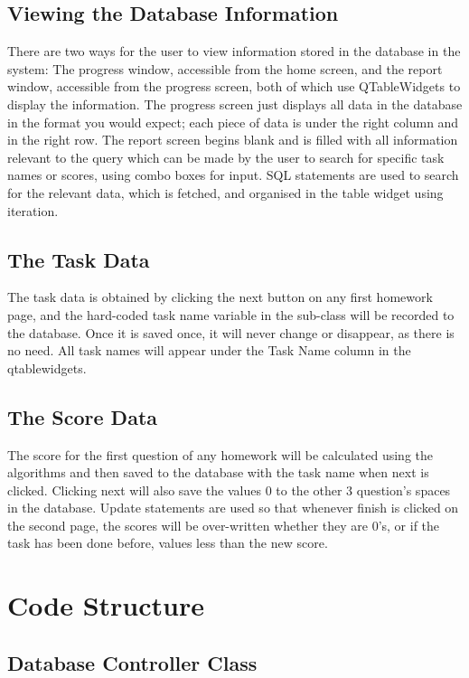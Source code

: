 \subsection{Viewing the Database Information}

There are two ways for the user to view information stored in the database in the system: The progress window, accessible from the home screen, and the report window, accessible from the progress screen, both of which use QTableWidgets to display the information. The progress screen just displays all data in the database in the format you would expect; each piece of data is under the right column and in the right row. The report screen begins blank and is filled with all information relevant to the query which can be made by the user to search for specific task names or scores, using combo boxes for input. SQL statements are used to search for the relevant data, which is fetched, and organised in the table widget using iteration.

\subsection{The Task Data}

The task data is obtained by clicking the next button on any first homework page, and the hard-coded task name variable in the sub-class will be recorded to the database. Once it is saved once, it will never change or disappear, as there is no need. All task names will appear under the Task Name column in the qtablewidgets.

\subsection{The Score Data}

The score for the first question of any homework will be calculated using the algorithms and then saved to the database with the task name when next is clicked. Clicking next will also save the values 0 to the other 3 question's spaces in the database. Update statements are used so that whenever finish is clicked on the second page, the scores will be over-written whether they are 0's, or if the task has been done before, values less than the new score.

\section{Code Structure}

\subsection{Database Controller Class}

